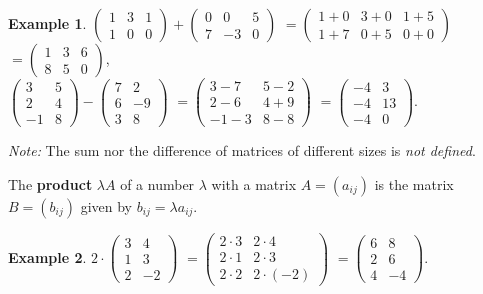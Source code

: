\documentclass[
  12pt,
  oneside]{book}
\theoremstyle{definition}
\theoremstyle{definition}
\newtheorem{example}{Example}[chapter]
\theoremstyle{definition}
\theoremstyle{definition}
\theoremstyle{remark}
\begin{document}
\begin{example}
\protect\hypertarget{exm:unnamed-chunk-43}{}\label{exm:unnamed-chunk-43}\(\begin{pmatrix}1 & 3 & 1\\ 1 & 0 & 0\end{pmatrix}+ \begin{pmatrix}0 & 0 & 5\\ 7 & -3 & 0\end{pmatrix}\)
\(=\begin{pmatrix}1+0&3+0&1+5\\1+7&0+5&0+0\end{pmatrix}\)
\(=\begin{pmatrix}1&3&6\\8&5&0\end{pmatrix}\),\\
\(\begin{pmatrix}3&5\\2&4\\-1&8\end{pmatrix}-\begin{pmatrix}7&2\\6&-9\\3&8\end{pmatrix}\)
\(=\begin{pmatrix}3-7&5-2\\2-6&4+9\\-1-3& 8-8\end{pmatrix}\)
\(=\begin{pmatrix}-4&3\\-4&13\\-4&0\end{pmatrix}\).
\end{example}

\emph{Note:} The sum nor the difference of matrices of different sizes is \emph{not defined}.

The \textbf{product} \(\lambda A\) of a number \(\lambda\) with a matrix \(A=(a_{ij})\) is the matrix \(B=(b_{ij})\) given by \(b_{ij}=\lambda a_{ij}\).

\begin{example}
\protect\hypertarget{exm:unnamed-chunk-44}{}\label{exm:unnamed-chunk-44}\(2\cdot \begin{pmatrix} 3 & 4\\ 1 & 3\\ 2 & -2\end{pmatrix}\)
\(=\begin{pmatrix}2\cdot3&2\cdot4\\ 2\cdot1&2\cdot 3\\2\cdot 2&2\cdot(-2)\end{pmatrix}\)
\(=\begin{pmatrix}6&8\\2&6\\4&-4\end{pmatrix}\).
\end{example}
\end{document}
